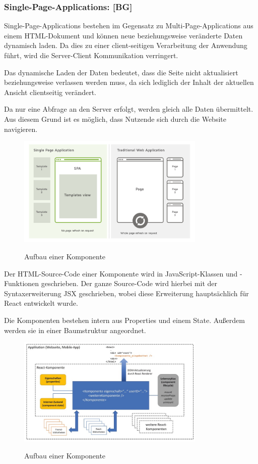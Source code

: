 \subsubsection{Single-Page-Applications: [BG]}

Single-Page-Applications bestehen im Gegensatz zu Multi-Page-Applications aus einem HTML-Dokument und können neue beziehungsweise veränderte Daten dynamisch laden. Da dies zu einer client-seitigen Verarbeitung der Anwendung führt, wird die Server-Client Kommunikation verringert.

Das dynamische Laden der Daten bedeutet, dass die Seite nicht aktualisiert beziehungsweise verlassen werden muss, da sich lediglich der Inhalt der aktuellen Ansicht clientseitig verändert.

Da nur eine Abfrage an den Server erfolgt, werden gleich alle Daten übermittelt. Aus diesem Grund ist es möglich, dass Nutzende sich durch die Website navigieren.

\cite{vergleichSPAundMPA} \cite{T3NReact}

\begin{figure}[H]
  \centering
  \includegraphics[width=0.8\textwidth]{pics/vergleichSPA-MPA.png}
  \caption{Aufbau einer Komponente}
  \cite{vergleichSPAundMPA}
\end{figure}

Der HTML-Source-Code einer Komponente wird in JavaScript-Klassen und -Funktionen geschrieben. Der ganze Source-Code wird hierbei mit der Syntaxerweiterung JSX geschrieben, wobei diese Erweiterung hauptsächlich für React entwickelt wurde.

Die Komponenten bestehen intern aus Properties und einem State. Außerdem werden sie in einer Baumstruktur angeordnet.
\cite{WasIstReact}

\begin{figure}[H]
  \centering
  \includegraphics[width=0.8\textwidth]{pics/aufbauReactComponent.jpg}
  \caption{Aufbau einer Komponente}
  \cite{WasIstReact}
\end{figure}


